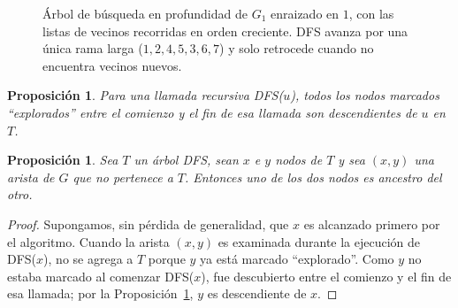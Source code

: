 \documentclass[12pt, spanish, oneside, openany]{book}
\newcommand{\alg}[1]{#1}
\theoremstyle{uprightplain}
\newtheorem{proposicion}[teorema]{Proposición}
\theoremstyle{definition}
\theoremstyle{remark}
\theoremstyle{definition}
\begin{document}
\begin{figure}[H]
\tikzset{external/export=false}
\centering
{}
\caption{Árbol de búsqueda en profundidad de $G_1$ enraizado en $1$, con las
listas de vecinos recorridas en orden creciente. DFS avanza por una única rama
larga ($1,2,4,5,3,6,7$) y solo retrocede cuando no encuentra vecinos nuevos.}
\label{fig:dfs-arbol}
\end{figure}

\begin{proposicion}
\label{prop:dfs-descendientes}
Para una llamada recursiva \alg{DFS}($u$), todos los nodos marcados ``explorados'' entre el comienzo y el fin de esa llamada son descendientes de $u$ en $T$.
\end{proposicion}

\begin{proposicion}
\label{prop:dfs-ancestro}
Sea $T$ un árbol DFS, sean $x$ e $y$ nodos de $T$ y sea $(x,y)$ una arista de $G$ que no pertenece a $T$. Entonces uno de los dos nodos es ancestro del otro.
\end{proposicion}
\begin{proof}
Supongamos, sin pérdida de generalidad, que $x$ es alcanzado primero por el algoritmo. Cuando la arista $(x,y)$ es examinada durante la ejecución de \alg{DFS}($x$), no se agrega a $T$ porque $y$ ya está marcado ``explorado''. Como $y$ no estaba marcado al comenzar \alg{DFS}($x$), fue descubierto entre el comienzo y el fin de esa llamada; por la Proposición~\ref{prop:dfs-descendientes}, $y$ es descendiente de $x$.
\end{proof}
\end{document}
